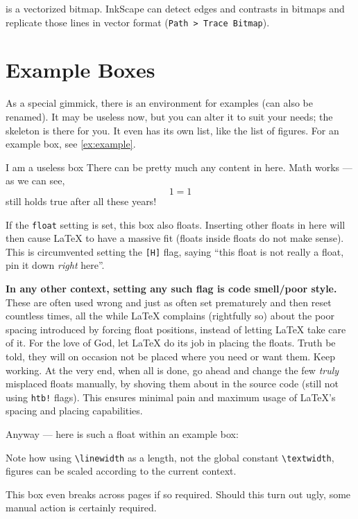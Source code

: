  is a vectorized bitmap.
InkScape can detect edges and contrasts in bitmaps and replicate those lines in
vector format (\texttt{Path > Trace Bitmap}).

\section{Example Boxes}

As a special gimmick, there is an environment for examples (can also be renamed).
It may be useless now, but you can alter it to suit your needs; the skeleton is
there for you.
It even has its own list, like the list of figures.
For an example box, see \cref{ex:example}.

\begin{example}[%
        label={ex:example},%
    ]{%
        I am a useless box%
    }
    There can be pretty much any content in here.
    Math works --- as we can see,
    \begin{equation}
        1 = 1
    \end{equation}
    still holds true after all these years!

    If the \verb|float| setting is set, this box also floats.
    Inserting other floats in here will then cause \LaTeX{} to have a massive fit
    (floats inside floats do not make sense).
    This is circumvented setting the \verb|[H]| flag,
    saying \enquote{this float is not really a float, pin it down \emph{right} here}.

    \textbf{In any other context, setting any such flag is code smell/poor style.}
    These are often used wrong and just as often set prematurely and then reset
    countless times, all the while \LaTeX{} complains (rightfully so) about the poor
    spacing introduced by forcing float positions, instead of letting \LaTeX{} take
    care of it.
    For the love of God, let \LaTeX{} do its job in placing the floats.
    Truth be told, they will on occasion not be placed where you need or want them.
    Keep working.
    At the very end, when all is done, go ahead and change the few \emph{truly}
    misplaced floats manually, by shoving them about in the source code
    (still not using \verb|htb!| flags).
    This ensures minimal pain and maximum usage of \LaTeX{}'s spacing and placing
    capabilities.

    Anyway --- here is such a float within an example box:
    \begin{center}
        \begin{minipage}[t]{0.4\linewidth}
            \label{fig:inside_float}
        \end{minipage}
        \hfill
        \begin{minipage}[t]{0.55\linewidth}
            
        \end{minipage}
    \end{center}
    Note how using \verb|\linewidth| as a length, not the global constant
    \verb|\textwidth|, figures can be scaled according to the current context.

    This box even breaks across pages if so required.
    Should this turn out ugly, some manual action is certainly required.
\end{example}
